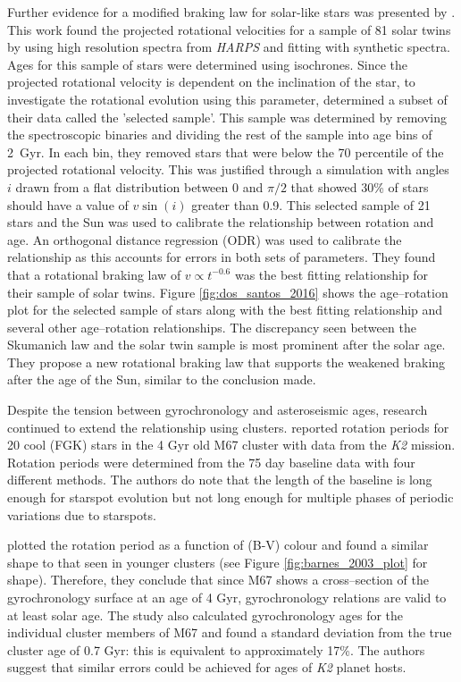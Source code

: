 Further evidence for a modified braking law for solar-like stars was presented by \citet{dos_Santos_etal_2016}. This work found the projected rotational velocities for a sample of 81 solar twins by using high resolution spectra from \textit{HARPS} and fitting with synthetic spectra. Ages for this sample of stars were determined using isochrones. Since the projected rotational velocity is dependent on the inclination of the star, to investigate the rotational evolution using this parameter, \citet{dos_Santos_etal_2016} determined a subset of their data called the 'selected sample'. This sample was determined by removing the spectroscopic binaries and dividing the rest of the sample into age bins of 2~Gyr. In each bin, they removed stars that were below the 70 percentile of the projected rotational velocity. This was justified through a simulation with angles $i$ drawn from a flat distribution between $0$ and $\pi/2$ that showed 30\% of stars should have a value of $v\sin(i)$ greater than 0.9. This selected sample of 21 stars and the Sun was used to calibrate the relationship between rotation and age. An orthogonal distance regression (ODR) was used to calibrate the relationship as this accounts for errors in both sets of parameters. They found that a rotational braking law of $v \propto t^{-0.6}$ was the best fitting relationship for their sample of solar twins. Figure \ref{fig:dos_santos_2016} shows the age--rotation plot for the selected sample of stars along with the best fitting relationship and several other age--rotation relationships. The discrepancy seen between the Skumanich law and the solar twin sample is most prominent after the solar age. They propose a new rotational braking law that supports the weakened braking after the age of the Sun, similar to the conclusion \citet{van_Saders_etal_2016} made.

Despite the tension between gyrochronology and asteroseismic ages, research continued to extend the relationship using clusters. \citet{Barnes_etal_2016} reported rotation periods for 20 cool (FGK) stars in the 4 Gyr old M67 cluster with data from the \textit{K2} mission. Rotation periods were determined from the 75 day baseline data with four different methods. The authors do note that the length of the baseline is long enough for starspot evolution but not long enough for multiple phases of periodic variations due to starspots.

\citet{Barnes_etal_2016} plotted the rotation period as a function of (B-V) colour and found a similar shape to that seen in younger clusters (see Figure \ref{fig:barnes_2003_plot} for shape). Therefore, they conclude that since M67 shows a cross--section of the gyrochronology surface at an age of 4 Gyr, gyrochronology relations are valid to at least solar age. The study also calculated gyrochronology ages for the individual cluster members of M67 and found a standard deviation from the true cluster age of 0.7 Gyr: this is equivalent to approximately 17\%. The authors suggest that similar errors could be achieved for ages of \textit{K2} planet hosts.

